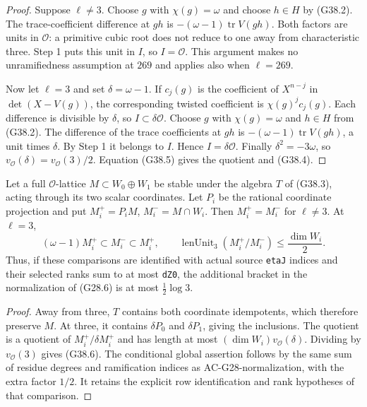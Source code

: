 \begin{proof}
Suppose $\ell\ne3$.  Choose $g$ with $\chi(g)=\omega$
and choose $h\in H$ by (G38.2).  The trace-coefficient
difference at $gh$ is
$-(\omega-1)\operatorname{tr}V(gh)$.
Both factors are units in $\mathcal O$: a primitive cubic
root does not reduce to one away from characteristic three.
Step 1 puts this unit in $I$, so $I=\mathcal O$.
This argument makes no unramifiedness assumption at $269$
and applies also when $\ell=269$.

Now let $\ell=3$ and set $\delta=\omega-1$.
If $c_j(g)$ is the coefficient of $X^{n-j}$ in
$\det(X-V(g))$, the corresponding twisted coefficient
is $\chi(g)^j c_j(g)$.  Each difference is divisible
by $\delta$, so $I\subset\delta\mathcal O$.
Choose $g$ with $\chi(g)=\omega$ and $h\in H$
from (G38.2).  The difference of the trace coefficients
at $gh$ is $-(\omega-1)\operatorname{tr}V(gh)$,
a unit times $\delta$.  By Step 1 it belongs to $I$.  Hence
$I=\delta\mathcal O$.
Finally $\delta^2=-3\omega$, so
$v_{\mathcal O}(\delta)=v_{\mathcal O}(3)/2$.
Equation (G38.5) gives the quotient and (G38.4).
\end{proof}

\begin{corollary}
\label{AC-G38-lattice}
Let a full $\mathcal O$-lattice $M\subset W_0\oplus W_1$
be stable under the algebra $T$ of (G38.3), acting through
its two scalar coordinates.  Let $P_i$ be the rational
coordinate projection and put
$M_i^+=P_iM$, $M_i^-=M\cap W_i$.
Then $M_i^+=M_i^-$ for $\ell\ne3$.  At $\ell=3$,
\[
 (\omega-1)M_i^+\subset M_i^-\subset M_i^+,
 \qquad
 \operatorname{lenUnit}_3(M_i^+/M_i^-)
                        \le\frac{\dim W_i}{2}.       \tag{G38.6}
\]
Thus, if these comparisons are identified with actual
source \texttt{etaJ} indices and their selected ranks
sum to at most \texttt{dZ0}, the additional bracket
in the normalization of (G28.6) is at most
$\tfrac12\log3$.
\end{corollary}
\begin{proof}
Away from three, $T$ contains both coordinate idempotents,
which therefore preserve $M$.  At three, it contains
$\delta P_0$ and $\delta P_1$, giving the inclusions.
The quotient is a quotient of
$M_i^+/\delta M_i^+$ and has length at most
$(\dim W_i)v_{\mathcal O}(\delta)$.
Dividing by $v_{\mathcal O}(3)$ gives (G38.6).
The conditional global assertion follows by the same
sum of residue degrees and ramification indices as
AC-G28-normalization, with the extra factor $1/2$.
It retains the explicit row identification and rank
hypotheses of that comparison.
\end{proof}

